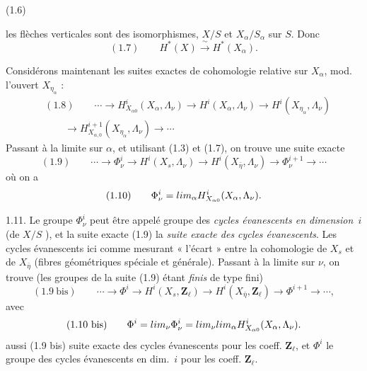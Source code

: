 \documentclass[11pt,a4paper]{article}
\begin{document}
(1.6)


les flèches verticales sont  des isomorphismes,  $X/S$ et $X_\alpha/S_\alpha$   sur $S$. Donc
\[
(1.7) \qquad H^*(X) \xrightarrow{\ \sim\ } H^*(X_\alpha) .
\]

Considérons maintenant les suites exactes de cohomologie relative sur $X_\alpha$, mod. l'ouvert $X_{\eta_\alpha}$ :
\[
\begin{aligned}
& (1.8) \qquad \cdots \to H^i_{X_{\alpha 0}}(X_\alpha, \Lambda_\nu) \to H^i(X_\alpha, \Lambda_\nu) \to H^i(X_{\eta_\alpha}, \Lambda_\nu) \\
& \qquad \to H^{i+1}_{X_{\alpha, 0}}(X_{\eta_\alpha}, \Lambda_\nu) \to \cdots
\end{aligned}
\]
Passant à la limite sur $\alpha$, et utilisant (1.3) et (1.7), on trouve une suite exacte
\[
(1.9) \qquad \cdots \to \Phi^i_\nu \to H^i(X_s, \Lambda_\nu) \to H^i(X_{\bar\eta}, \Lambda_\nu) \to \Phi^{i+1}_\nu \to \cdots
\]
où on a
\[
(1.10) \qquad \Phi^i_\nu = \varinjlim_\alpha H^i_{X_{\alpha 0}}(X_\alpha, \Lambda_\nu) .
\]


1.11. Le groupe $\Phi^i_\nu$ peut être appelé groupe des \emph{cycles évanescents en dimension~$i$} (de $X/S$ ), et la suite exacte (1.9) la \emph{suite exacte des cycles évanescents}. Les cycles évanescents  ici comme mesurant « l'écart » entre la cohomologie de $X_s$ et de $X_{\bar\eta}$ (fibres géométriques spéciale et générale). Passant à la limite  sur $\nu$, on trouve (les groupes de la suite (1.9) étant \emph{finis} \ill{} \ill{} de type fini)
\[
(1.9\ \text{bis}) \qquad \cdots \to \Phi^i \to H^i(X_s, \mathbf{Z}_\ell) \to H^i(X_{\bar\eta}, \mathbf{Z}_\ell) \to \Phi^{i+1} \to \cdots ,
\]
avec
\[
(1.10\ \text{bis}) \qquad \Phi^i = \varprojlim_\nu \Phi^i_\nu = \varprojlim_\nu \varinjlim_\alpha H^i_{X_{\alpha 0}}(X_\alpha, \Lambda_\nu) .
\]
  aussi (1.9 bis) suite exacte des cycles évanescents pour les coeff. $\mathbf{Z}_\ell$, et $\Phi^i$ le groupe des cycles évanescents en dim.~$i$ pour les coeff. $\mathbf{Z}_\ell$.
\end{document}

